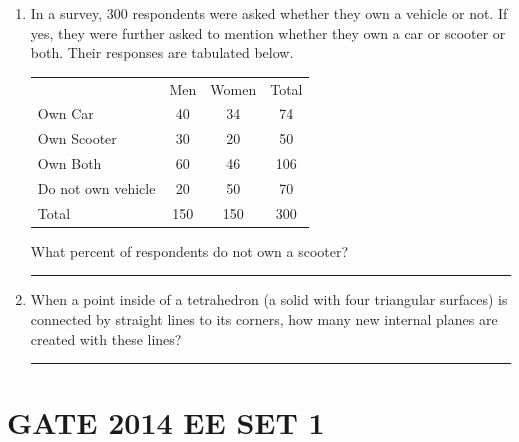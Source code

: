 \documentclass[journal,12pt,onecolumn]{IEEEtran}
\begin{document}
\begin{enumerate}[label=Q\arabic*:, leftmargin=*, itemindent=0pt, resume]
\item In a survey, 300 respondents were asked whether they own a vehicle or not. If yes, they were further asked to mention whether they own a car or scooter or both. Their responses are tabulated below.

\begin{center}
\begin{tabular}{lccc}
& Men & Women & Total \\
Own Car & 40 & 34 & 74 \\
Own Scooter & 30 & 20 & 50 \\
Own Both & 60 & 46 & 106 \\
Do not own vehicle & 20 & 50 & 70 \\
\hline
Total & 150 & 150 & 300 \\
\end{tabular}
\end{center}

What percent of respondents do not own a scooter?

\rule{4cm}{0.15mm}

\item When a point inside of a tetrahedron (a solid with four triangular surfaces) is connected by straight lines to its corners, how many new internal planes are created with these lines?

\rule{4cm}{0.15mm}

\end{enumerate}


\section*{GATE 2014 EE SET 1}
\end{document}
